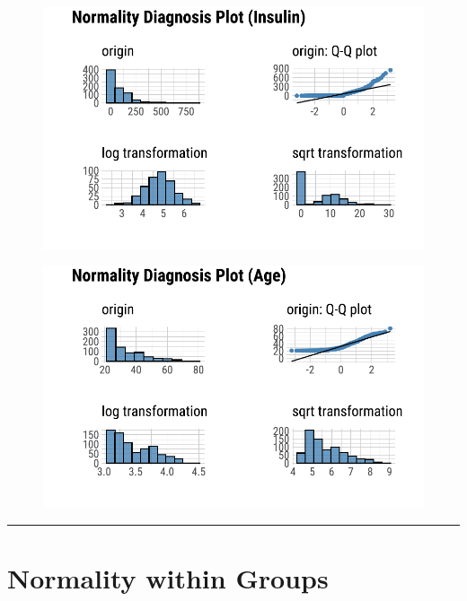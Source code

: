 \documentclass[
  letterpaper,
  DIV=11,
  numbers=noendperiod]{scrreprt}
\begin{document}
\begin{figure}[H]

{\centering \includegraphics{./TransformingLikeDataTrans_files/figure-pdf/unnamed-chunk-5-2.pdf}

}

\end{figure}

\begin{figure}[H]

{\centering \includegraphics{./TransformingLikeDataTrans_files/figure-pdf/unnamed-chunk-5-3.pdf}

}

\end{figure}

\begin{center}\rule{0.5\linewidth}{0.5pt}\end{center}

\hypertarget{normality-within-groups-1}{%
\section{Normality within Groups}\label{normality-within-groups-1}}
\end{document}

